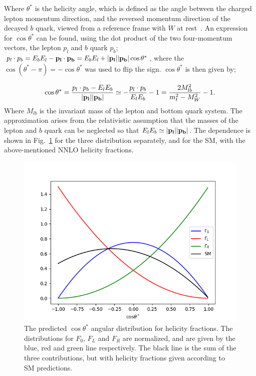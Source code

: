 \documentclass[12pt,a4paper]{article}
\numberwithin{equation}{section}
\begin{document}
Where $\theta^*$ is the helicity angle, which is defined as the angle between the
charged lepton momentum direction, and the reversed momentum direction of the
decayed $b$ quark, viewed from a reference frame with $W$ at
rest~\cite{PhysRevD.45.124}. An expression for $\cos \theta^*$ can be found, using
the dot product of the two four-momentum vectors, the lepton $p_l$ and $b$ quark
$p_b$; $p_l\cdot p_b=E_bE_l-\vb{p_l\cdot p_b}=E_bE_l+\abs{\vb{p_l}}\abs{\vb{p_b}}\cos \theta^*$,
where the $\cos{(\theta^{*}-\pi)}=-\cos \theta^{*}$ was used to flip the sign.
$\cos \theta^{*}$ is then given by;


\begin{equation}
  \cos \theta^*=\frac{p_l\cdot p_b-E_lE_b}{\abs{\vb{p_l}}\abs{\vb{p_b}}}\\
  \simeq -\frac{p_l\cdot p_b}{E_lE_b} - 1 = \frac{2 M_{lb}^2}{m_t^2 - M_W^2} - 1. \label{eq:costheta}
\end{equation}
Where $M_{lb}$ is the invariant mass of the lepton and bottom quark system. The
approximation arises from the relativistic assumption that the masses of the
lepton and $b$ quark can be neglected so that
$E_lE_b\simeq \abs{\vb{p_l}}\abs{\vb{p_b}}$. The dependence is shown in
Fig.~\ref{fig:distributions} for the three distribution separately, and for the
SM, with the above-mentioned NNLO helicity fractions.
\begin{figure}[H]
  \centering
	\includegraphics[width=0.7\linewidth]{figures/angular_dist.png}
	\caption{The predicted $\cos \theta^{*}$ angular distribution for helicity
    fractions. The distributions for $F_{0}$, $F_{L}$ and $F_{R}$ are
    normalized, and are given by the blue, red and green line respectively. The
    black line is the sum of the three contributions, but with helicity
    fractions given according to SM predictions.}\label{fig:distributions}
\end{figure}
\end{document}
